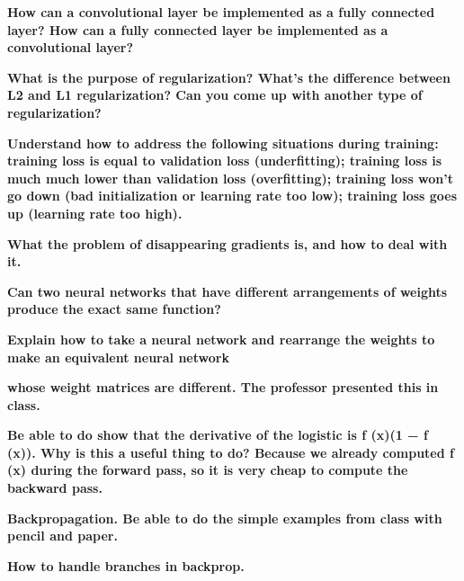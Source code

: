 \documentclass[10pt,letterpaper]{article}
\begin{document}
\subitem \textbf{ How can a convolutional layer be implemented as a fully connected layer? How can a fully connected layer be implemented as a convolutional layer?}
\begin{solution}
\end{solution}
\subitem \textbf{ What is the purpose of regularization? What’s the difference between L2 and L1 regularization? Can you come up with another type of regularization?}
\begin{solution}
\end{solution}
\subitem \textbf{ Understand how to address the following situations during training: training loss is equal to validation loss (underfitting); training loss is much much lower than validation loss (overfitting); training loss won’t go down (bad initialization or learning rate too low); training loss goes up (learning rate too high).}
\begin{solution}
\end{solution}
\subitem \textbf{ What the problem of disappearing gradients is, and how to deal with it.}
\begin{solution}
\end{solution}
\subitem \textbf{ Can two neural networks that have different arrangements of weights produce the exact same function?}
\begin{solution}
\end{solution}
\subitem \textbf{ Explain how to take a neural network and rearrange the weights to make an equivalent neural network}
\begin{solution}
\end{solution}
\subitem \textbf{ whose weight matrices are different. The professor presented this in class.}
\begin{solution}
\end{solution}
\subitem \textbf{ Be able to do show that the derivative of the logistic is f (x)(1 − f (x)). Why is this a useful thing to do? Because we already computed f (x) during the forward pass, so it is very cheap to compute the backward pass.}
\begin{solution}
\end{solution}
\subitem \textbf{ Backpropagation. Be able to do the simple examples from class with pencil and paper.}
\begin{solution}
\end{solution}
\subitem \textbf{ How to handle branches in backprop.}
\begin{solution}
\end{solution}
\end{document}
